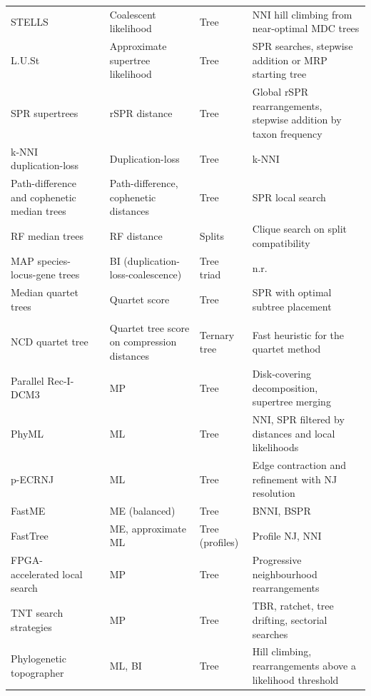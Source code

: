 \begin{landscape}
{\begin{longtable}{>{\raggedright\arraybackslash}p{3.4cm}>{\raggedright\arraybackslash}p{4.0cm}>{\raggedright\arraybackslash}p{3.6cm}>{\raggedright\arraybackslash}p{2.2cm}>{\raggedright\arraybackslash}p{4.5cm}}
STELLS & \cite{R04727} & Coalescent likelihood & Tree & NNI hill climbing from near-optimal MDC trees\\
L.U.St & \cite{R05490} & Approximate supertree likelihood & Tree & SPR searches, stepwise addition or MRP starting tree\\
SPR supertrees & \cite{R03673} & rSPR distance & Tree & Global rSPR rearrangements, stepwise addition by taxon frequency\\
k-NNI duplication-loss & \cite{R04023} & Duplication-loss & Tree & k-NNI\\
Path-difference and cophenetic median trees & \cite{R00378,R05278,R05279,R04205,R04208,R04211} & Path-difference, cophenetic distances & Tree & SPR local search\\
RF median trees & \cite{R05277} & RF distance & Splits & Clique search on split compatibility\\
MAP species-locus-gene trees & \cite{R05282} & BI (duplication-loss-coalescence) & Tree triad & n.r.\\
Median quartet trees & \cite{R07226,R05871} & Quartet score & Tree & SPR with optimal subtree placement\\
\addlinespace
\multicolumn{5}{l}{\textit{Tree inference}}\\
NCD quartet tree & \cite{R08724} & Quartet tree score on compression distances & Ternary tree & Fast heuristic for the quartet method\\
Parallel Rec-I-DCM3 & \cite{R01207} & MP & Tree & Disk-covering decomposition, supertree merging\\
PhyML & \cite{R03006,R03429} & ML & Tree & NNI, SPR filtered by distances and local likelihoods\\
p-ECRNJ & \cite{R05515} & ML & Tree & Edge contraction and refinement with NJ resolution\\
FastME & \cite{R04150,R03394} & ME (balanced) & Tree & BNNI, BSPR\\
FastTree & \cite{R03350} & ME, approximate ML & Tree (profiles) & Profile NJ, NNI\\
FPGA-accelerated local search & \cite{R04060,R04058,R04059,R06344,R06564} & MP & Tree & Progressive neighbourhood rearrangements\\
TNT search strategies & \cite{R01997,R01999,R02120} & MP & Tree & TBR, ratchet, tree drifting, sectorial searches\\
Phylogenetic topographer & \cite{R03801} & ML, BI & Tree & Hill climbing, rearrangements above a likelihood threshold\\

\end{longtable}}
\end{landscape}
